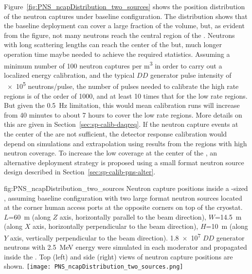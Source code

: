 Figure~\ref{fig:PNS_ncapDistribution_two_sources} shows the position distribution of the neutron captures under baseline configuration. The distribution shows that the baseline deployment can cover a large fraction of the  volume, but, as evident from the figure, not many neutrons reach the central region of the . Neutrons with long scattering lengths can reach the center of the  but, much longer operation time maybe needed to achieve the required statistics. Assuming a minimum number of \num{100} neutron captures per \si{\cubic\m} in order to carry out a localized energy calibration, and the typical $DD$ generator pulse intensity of \num{e5} neutrons/pulse, the number of pulses needed to calibrate the high rate regions is of the order of \num{1000}, and at least \num{10} times that for the low rate regions. But given the \SI{0.5}{\hertz}  limitation, this would mean calibration runs will increase from 40 minutes to about \num{7} hours to cover the low rate regions. More details on this are given in Section~\ref{sec:sp-calib-daqreq}.
If the neutron capture events at the center of the  are not sufficient, the detector response calibration would depend on simulations and extrapolation using results from the regions with high neutron coverage. To increase the low coverage at the center of the , an alternative deployment strategy is proposed using a small format neutron source design described in Section~\ref{sec:sp-calib-pns-alter}. 

\begin{dunefigure}{fig:PNS_ncapDistribution_two_sources}
{Neutron capture positions inside a -sized , assuming baseline configuration with two large format neutron sources located at the corner human access ports at the opposite corners on top of the cryostat. $L$=\SI{60}{\m} (along $Z$ axis, horizontally parallel to the beam direction), $W$=\SI{14.5}{\m} (along $X$ axis, horizontally perpendicular to the beam direction), $H$=\SI{10}{\m} (along $Y$ axis, vertically perpendicular to the beam direction). \num{1.8e7} $DD$ generator neutrons with \SI{2.5}{\MeV} energy were simulated in each moderator and propagated inside the . Top (left) and side (right) views of neutron capture positions are shown.}
\texttt{[image: PNS\_ncapDistribution\_two\_sources.png]}
\end{dunefigure}

